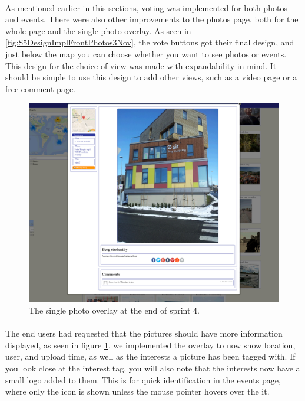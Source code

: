 \paragraph{} As mentioned earlier in this sections, voting was implemented for both photos and events. There were also other improvements to the photos page, both for the whole page and the single photo overlay. As seen in \ref{fig:S5DesignImplFrontPhotos3Nov}, the vote buttons got their final design, and just below the map you can choose whether you want to see photos or events. This design for the choice of view was made with expandability in mind. It should be simple to use this design to add other views, such as a video page or a free comment page.

\begin{figure}[ht!]
  \centering
  \includegraphics[width=\linewidth]{./img/webpage/3Nov/PhotoOverlay}
  \caption{The single photo overlay at the end of sprint 4.}
  \label{fig:S5DesignImplPhotoOverlay3Nov}
\end{figure}

\paragraph{} The end users had requested that the pictures should have more information displayed, as seen in figure \ref{fig:S5DesignImplPhotoOverlay3Nov}, we implemented the overlay to now show location, user, and upload time, as well as the interests a picture has been tagged with. If you look close at the interest tag, you will also note that the interests now have a small logo added to them. This is for quick identification in the events page, where only the icon is shown unless the mouse pointer hovers over the it.

